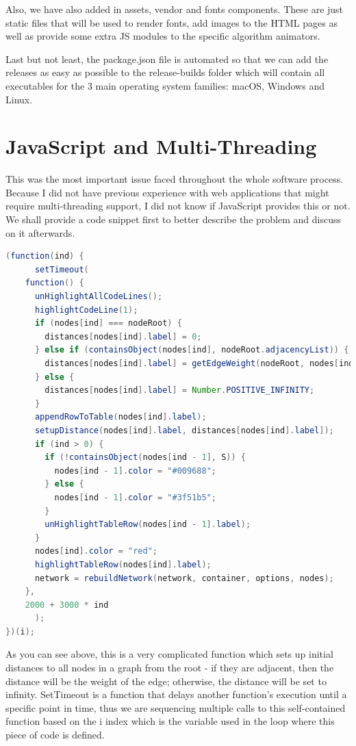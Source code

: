 \documentclass{l4proj}
\begin{document}
Also, we have also added in assets, vendor and fonts components. These are just static files that will be used to render fonts,
add images to the HTML pages as well as provide some extra JS modules to the specific algorithm animators. 

Last but not least, the package.json file is automated so that we can add the releases as easy as possible to the
release-builds folder which will contain all executables for the 3 main operating system families: macOS, Windows and
Linux.

\section{JavaScript and Multi-Threading}

This was the most important issue faced throughout the whole software process. Because I did not have previous
experience with web applications that might require multi-threading support, I did not know if JavaScript provides this
or not. We shall provide a code snippet first to better describe the problem and discuss on it afterwards.

\begin{lstlisting}[language=Java, caption=Animation function used in Dijkstra's SP algorithm.]
(function(ind) {
      setTimeout(
	function() {
	  unHighlightAllCodeLines();
	  highlightCodeLine(1);
	  if (nodes[ind] === nodeRoot) {
	    distances[nodes[ind].label] = 0;
	  } else if (containsObject(nodes[ind], nodeRoot.adjacencyList)) {
	    distances[nodes[ind].label] = getEdgeWeight(nodeRoot, nodes[ind]);
	  } else {
	    distances[nodes[ind].label] = Number.POSITIVE_INFINITY;
	  }
	  appendRowToTable(nodes[ind].label);
	  setupDistance(nodes[ind].label, distances[nodes[ind].label]);
	  if (ind > 0) {
	    if (!containsObject(nodes[ind - 1], S)) {
	      nodes[ind - 1].color = "#009688";
	    } else {
	      nodes[ind - 1].color = "#3f51b5";
	    }
	    unHighlightTableRow(nodes[ind - 1].label);
	  }
	  nodes[ind].color = "red";
	  highlightTableRow(nodes[ind].label);
	  network = rebuildNetwork(network, container, options, nodes);
	},
	2000 + 3000 * ind
      );
})(i);
\end{lstlisting}

As you can see above, this is a very complicated function which sets up initial distances to all nodes in a graph from
the root - if they are adjacent, then the distance will be the weight of the edge; otherwise, the distance will be set
to infinity. SetTimeout is a function that delays another function's execution until a specific point in time, thus we are sequencing
multiple calls to this self-contained function based on the i index which is the variable used in the loop where
this piece of code is defined. 
\end{document}
